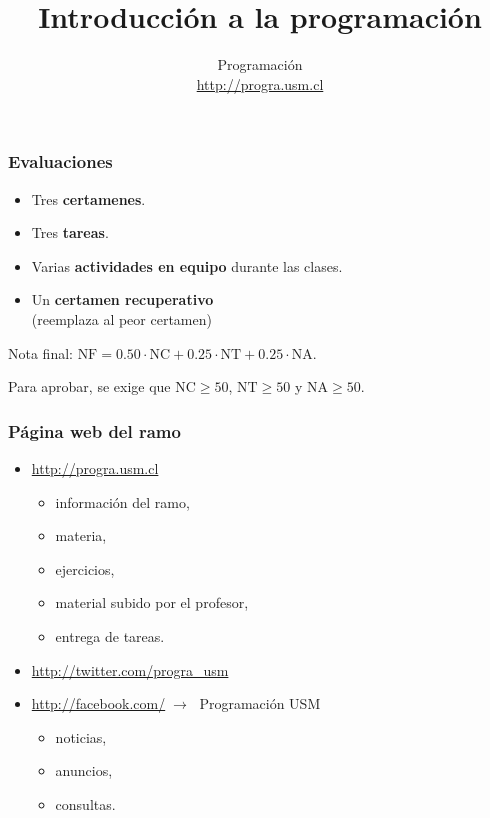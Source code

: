 \documentclass[12pt]{beamer}
\title{Introducción a la programación}
\author{Programación \\ \url{http://progra.usm.cl}}
\date{}
\begin{document}
  \begin{frame}
    \maketitle
  \end{frame}

  \begin{frame}
    \frametitle{Evaluaciones}
    \label{evaluaciones}
    \begin{itemize}
      \item Tres \textbf{certamenes}.
      \item Tres \textbf{tareas}.
      \item Varias \textbf{actividades en equipo} durante las clases.
      \item Un \textbf{certamen recuperativo} \\ (reemplaza al peor certamen)
    \end{itemize}

    \vfill
    Nota final: \(\displaystyle
      \text{NF} = 0.50\cdot\text{NC} +
                  0.25\cdot\text{NT} +
                  0.25\cdot\text{NA}.
    \)

    \vfill
    Para aprobar,
    se exige que
    \(\text{NC}\ge 50\),
    \(\text{NT}\ge 50\) y
    \(\text{NA}\ge 50\).
  \end{frame}

  \begin{frame}
    \frametitle{Página web del ramo}
    \label{web}
    \begin{itemize}
      \item \url{http://progra.usm.cl}
        \begin{itemize}
          \item información del ramo,
          \item materia,
          \item ejercicios,
          \item material subido por el profesor,
          \item entrega de tareas.
        \end{itemize}
      \vfill
      \item \url{http://twitter.com/progra_usm}
      \item \url{http://facebook.com/}\(\;\rightarrow\;\) Programación USM
        \begin{itemize}
          \item noticias,
          \item anuncios,
          \item consultas.
        \end{itemize}
    \end{itemize}
  \end{frame}
\end{document}
